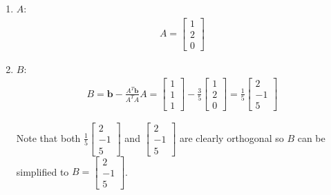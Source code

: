 \documentclass[10pt,a4paper]{article}
\begin{document}
\begin{enumerate}
    \item $A$:
    \begin{align*}
        A = \begin{bmatrix}
            1\\2\\0
        \end{bmatrix}
    \end{align*}

    \item $B$:
    \begin{align*}
        B = \textbf{b} - \frac{A^T \textbf{b}}{A^T A} A = \begin{bmatrix}
            1\\1\\1
        \end{bmatrix} - \frac{3}{5} \begin{bmatrix}
            1\\2\\0
        \end{bmatrix} = \frac{1}{5}\begin{bmatrix}
            2\\-1\\5
        \end{bmatrix}
    \end{align*}

    \pagebreak

    Note that both $\frac{1}{5}\begin{bmatrix}
        2\\-1\\5
    \end{bmatrix}$ and $\begin{bmatrix}
        2\\-1\\5
    \end{bmatrix}$ are clearly orthogonal so $B$ can be simplified to $B = \begin{bmatrix}
        2\\-1\\5
    \end{bmatrix}$.


\end{enumerate}
\end{document}
